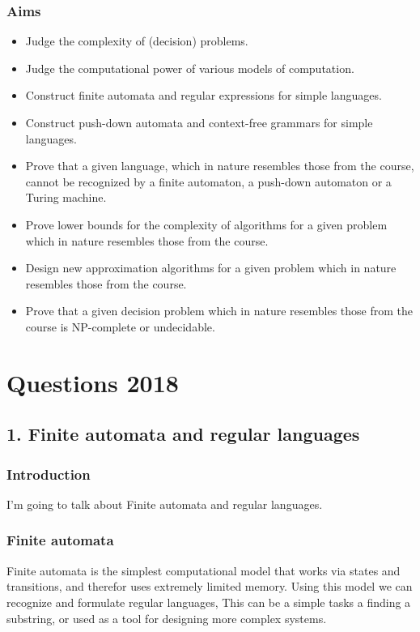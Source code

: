 \documentclass[a4paper,10pt,titlepage]{report}
\begin{document}
\subsection{Aims}
\begin{itemize}
\item Judge the complexity of (decision) problems.
\item Judge the computational power of various models of computation.
\item Construct finite automata and regular expressions for simple languages.
\item Construct push-down automata and context-free grammars for simple languages.
\item Prove that a given language, which in nature resembles those from the course,
cannot be recognized by a finite automaton, a push-down automaton or a Turing machine.
\item Prove lower bounds for the complexity of algorithms for a given problem which in nature resembles those from the course.
\item Design new approximation algorithms for a given problem which in nature resembles those from the course.
\item Prove that a given decision problem which in nature resembles those from the course is NP-complete or undecidable.
\end{itemize}

\newpage
\chapter{Questions 2018}
\newpage
\section{1. Finite automata and regular languages}

\subsection{Introduction}
I'm going to talk about Finite automata and regular languages.

\subsection{Finite automata}
	Finite automata is the simplest computational model that works via states and transitions, and therefor uses extremely limited memory. Using this model we can recognize and formulate regular languages, This can be a simple tasks a finding a substring, or used as a tool for designing more complex systems. \\
	
\end{document}
